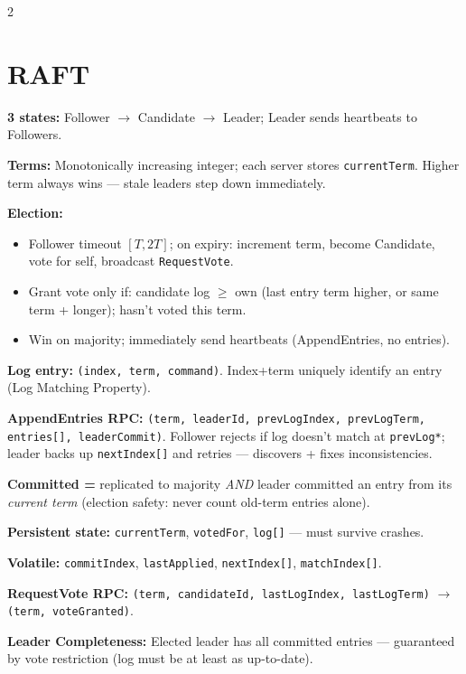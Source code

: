 \documentclass[9pt]{article}
\begin{document}
\begin{multicols*}{2}
\section*{RAFT}

\textbf{3 states:} Follower $\to$ Candidate $\to$ Leader; Leader sends heartbeats to Followers.

\textbf{Terms:} Monotonically increasing integer; each server stores \texttt{currentTerm}. Higher term always wins — stale leaders step down immediately.

\textbf{Election:}
\begin{itemize}
  \item Follower timeout $[T,2T]$; on expiry: increment term, become Candidate, vote for self, broadcast \texttt{RequestVote}.
  \item Grant vote only if: candidate log $\ge$ own (last entry term higher, or same term + longer); hasn't voted this term.
  \item Win on majority; immediately send heartbeats (AppendEntries, no entries).
\end{itemize}

\textbf{Log entry:} \texttt{(index, term, command)}. Index+term uniquely identify an entry (Log Matching Property).

\textbf{AppendEntries RPC:} \texttt{(term, leaderId, prevLogIndex, prevLogTerm, entries[], leaderCommit)}. Follower rejects if log doesn't match at \texttt{prevLog*}; leader backs up \texttt{nextIndex[]} and retries — discovers + fixes inconsistencies.

\textbf{Committed =} replicated to majority \emph{AND} leader committed an entry from its \emph{current term} (election safety: never count old-term entries alone).

\textbf{Persistent state:} \texttt{currentTerm}, \texttt{votedFor}, \texttt{log[]} — must survive crashes.

\textbf{Volatile:} \texttt{commitIndex}, \texttt{lastApplied}, \texttt{nextIndex[]}, \texttt{matchIndex[]}.

\textbf{RequestVote RPC:} \texttt{(term, candidateId, lastLogIndex, lastLogTerm)} $\to$ \texttt{(term, voteGranted)}.

\textbf{Leader Completeness:} Elected leader has all committed entries — guaranteed by vote restriction (log must be at least as up-to-date).


\end{multicols*}
\end{document}

